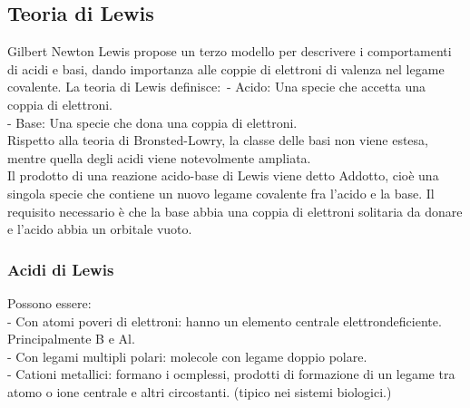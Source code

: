 \subsection{Teoria di Lewis}
Gilbert Newton Lewis propose un terzo modello per descrivere i comportamenti di acidi e basi, dando importanza alle coppie di elettroni di valenza nel legame covalente. La teoria di Lewis definisce:\
\tab- Acido: Una specie che accetta una coppia di elettroni.\\
\tab- Base: Una specie che dona una coppia di elettroni.\\
Rispetto alla teoria di Bronsted-Lowry, la classe delle basi non viene estesa, mentre quella degli acidi viene notevolmente ampliata.\\
Il prodotto di una reazione acido-base di Lewis viene detto Addotto, cioè una singola specie che contiene un nuovo legame covalente fra l'acido e la base. Il requisito necessario è che la base abbia una coppia di elettroni solitaria da donare e l'acido abbia un orbitale vuoto.\\
\subsubsection{Acidi di Lewis}
Possono essere:\\
\tab- Con atomi poveri di elettroni: hanno un elemento centrale elettrondeficiente. Principalmente B e Al.\\
\tab- Con legami multipli polari: molecole con legame doppio polare.\\
\tab- Cationi metallici: formano i ocmplessi, prodotti di formazione di un legame tra atomo o ione centrale e altri circostanti. (tipico nei sistemi biologici.)
